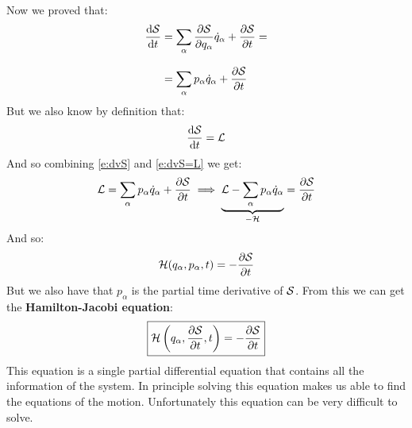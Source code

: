 Now we proved that:
\begin{equation}
  \begin{split} \label{e:dvS}
    \dv{\action}{t} &= \bigsum_{\alpha} \pdv{\action}{q_{\alpha}}\dot{q}_{\alpha} + \pdv{\action}{t} =\\[8pt]
    &= \bigsum_{\alpha} p_{\alpha}\dot{q}_{\alpha} + \pdv{\action}{t}
  \end{split}
\end{equation}
But we also know by definition that:
\begin{equation} \label{e:dvS=L}
  \dv{\action}{t} = \lagr
\end{equation}
And so combining \eqref{e:dvS} and \eqref{e:dvS=L} we get:
\begin{equation}
  \lagr = \bigsum_{\alpha} p_{\alpha}\dot{q}_{\alpha} + \pdv{\action}{t} \implies \underbrace{\lagr - \bigsum_{\alpha} p_{\alpha}\dot{q}_{\alpha}}_{-\hamfun} = \pdv{\action}{t}
\end{equation}
And so:
\begin{equation}
  \hamfun (q_{\alpha}, p_{\alpha},t) = -\pdv{\action}{t}
\end{equation}
But we also have that $p_{\alpha}$ is the partial time derivative of $\mathcal{S}$. From this we can get the \textbf{Hamilton-Jacobi equation}:
\begin{equation} \label{e:hamiltonjacobi}
  \boxed{\hamfun \brackets{q_{\alpha}, \pdv{\action}{t},t} = -\pdv{\action}{t}}
\end{equation}
This equation is a single partial differential equation that contains all the information of the system. In principle solving this equation makes us able to find the equations of the motion. Unfortunately this equation can be very difficult to solve.
